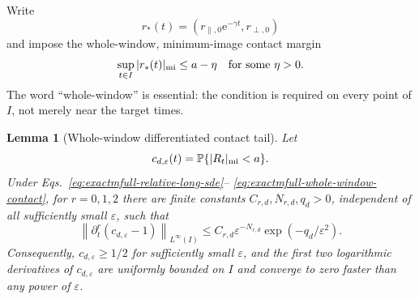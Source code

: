 \documentclass{iopjournal}
\newcommand{\e}{\mathrm e}
\theoremstyle{plain}
\newtheorem{lemma}[theorem]{Lemma}
\theoremstyle{definition}
\begin{document}
Write
\begin{equation}
 r_*(t)=(r_{\parallel,0}\e^{-\gamma t},r_{\perp,0})
 \label{eq:exactmfull-relative-deterministic-path}
\end{equation}
and impose the whole-window, minimum-image contact margin
\begin{equation}
 \sup_{t\in I}|r_*(t)|_{\rm mi}\le a-\eta
 \quad\text{for some }\eta>0.
 \label{eq:exactmfull-whole-window-contact}
\end{equation}
The word ``whole-window'' is essential: the condition is required on every
point of \(I\), not merely near the target times.

\begin{lemma}[Whole-window differentiated contact tail]
\label{lem:exactmfull-contact-tail}
Let
\begin{equation}
 c_{d,\varepsilon}(t)
 =\mathbb P\{|R_t|_{\rm mi}<a\}.
 \label{eq:exactmfull-contact-probability}
\end{equation}
Under Eqs.~\eqref{eq:exactmfull-relative-long-sde}--
\eqref{eq:exactmfull-whole-window-contact}, for \(r=0,1,2\) there are finite
constants \(C_{r,d},N_{r,d},q_d>0\), independent of all sufficiently small
\(\varepsilon\), such that
\begin{equation}
 \left\|\partial_t^r(c_{d,\varepsilon}-1)\right\|_{L^\infty(I)}
 \le C_{r,d}\varepsilon^{-N_{r,d}}
       \exp(-q_d/\varepsilon^2).
 \label{eq:exactmfull-contact-tail-bound}
\end{equation}
Consequently, \(c_{d,\varepsilon}\ge1/2\) for sufficiently small
\(\varepsilon\), and the first two logarithmic derivatives of
\(c_{d,\varepsilon}\) are uniformly bounded on \(I\) and converge to zero
faster than any power of \(\varepsilon\).
\end{lemma}
\end{document}
